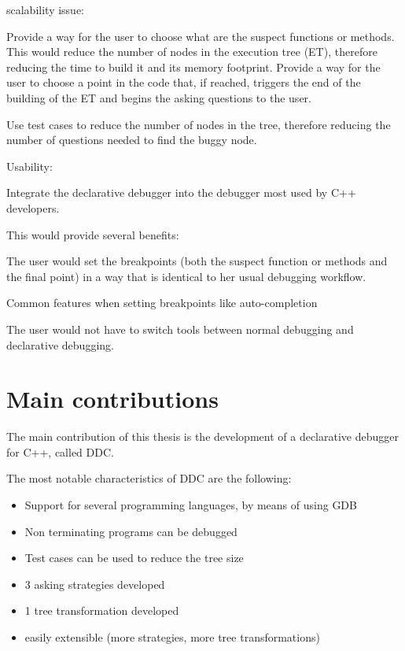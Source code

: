 scalability issue:

Provide a way for the user to choose what are the suspect functions or methods.
This would reduce the number of nodes in the execution tree (ET), therefore reducing the time to build it and its memory footprint.
Provide a way for the user to choose a point in the code that, if reached, triggers the end of the building of the ET and begins the asking questions to the user.

Use test cases to reduce the number of nodes in the tree, therefore reducing the number of questions needed to find the buggy node.

Usability:

Integrate the declarative debugger into the debugger most used by C++ developers.

This would provide several benefits:

The user would set the breakpoints (both the suspect function or methods and the final point) in a way that is identical to her usual debugging workflow.

Common features when setting breakpoints like auto-completion

The user would not have to switch tools between normal debugging and declarative debugging.
\section{Main contributions}

The main contribution of this thesis is the development of a declarative debugger for C++, called DDC.

The most notable characteristics of DDC are the following:
\begin{itemize}
\item Support for several programming languages, by means of using GDB
\item Non terminating programs can be debugged
\item Test cases can be used to reduce the tree size
\item 3 asking strategies developed
\item 1 tree transformation developed
\item easily extensible (more strategies, more tree transformations)
\end{itemize}